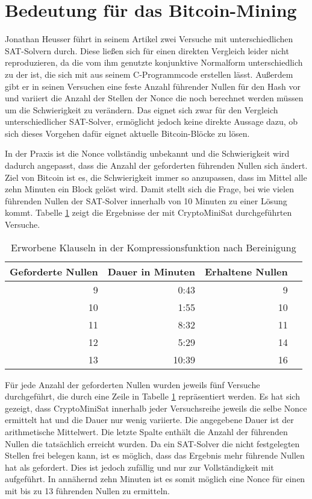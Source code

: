 \section{Bedeutung für das Bitcoin-Mining}

Jonathan Heusser führt in seinem Artikel \cite{jona:1} zwei Versuche mit unterschiedlichen SAT-Solvern durch.
Diese ließen sich für einen direkten Vergleich leider nicht reproduzieren, da die vom ihm genutzte konjunktive
Normalform unterschiedlich zu der ist, die sich mit  aus seinem C-Programmcode erstellen lässt.
Außerdem gibt er in seinen Versuchen eine feste Anzahl führender Nullen für den Hash vor und variiert die
Anzahl der Stellen der Nonce die noch berechnet werden müssen um die Schwierigkeit zu verändern. Das eignet
sich zwar für den Vergleich unterschiedlicher SAT-Solver, ermöglicht jedoch keine direkte Aussage dazu, ob
sich dieses Vorgehen dafür eignet aktuelle Bitcoin-Blöcke zu lösen.

In der Praxis ist die Nonce vollständig unbekannt und die Schwierigkeit wird dadurch angepasst, dass die Anzahl
der geforderten führenden Nullen sich ändert. Ziel von Bitcoin ist es, die Schwierigkeit immer so anzupassen, dass im Mittel
alle zehn Minuten ein Block gelöst wird. Damit stellt sich die Frage, bei wie vielen führenden Nullen der SAT-Solver
innerhalb von 10 Minuten zu einer Lösung kommt. Tabelle \ref{fig:bitcoinzeros} zeigt die Ergebnisse der mit CryptoMiniSat
durchgeführten Versuche.

\begin{table}[!h]
  \centering
  \begin{tabular}{rr|rr}
    Geforderte Nullen & Dauer in Minuten & Erhaltene Nullen \\
    \hline
     9 &  0:43 &  9 \\
    10 &  1:55 & 10 \\
    11 &  8:32 & 11 \\
    12 &  5:29 & 14 \\
    13 & 10:39 & 16
  \end{tabular}
  \caption{Erworbene Klauseln in der Kompressionsfunktion nach Bereinigung}
  \label{fig:bitcoinzeros}
\end{table}

Für jede Anzahl der geforderten Nullen wurden jeweils fünf Versuche durchgeführt, die durch eine Zeile in Tabelle \ref{fig:bitcoinzeros}
repräsentiert werden. Es hat sich gezeigt, dass CryptoMiniSat innerhalb jeder Versuchsreihe jeweils die selbe Nonce ermittelt hat
und die Dauer nur wenig variierte. Die angegebene Dauer ist der arithmetische Mittelwert. Die letzte Spalte enthält die Anzahl der
führenden Nullen die tatsächlich erreicht wurden. Da ein SAT-Solver die nicht festgelegten Stellen frei belegen kann, ist es möglich,
dass das Ergebnis mehr führende Nullen hat als gefordert. Dies ist jedoch zufällig und nur zur Vollständigkeit mit aufgeführt.
In annähernd zehn Minuten ist es somit möglich eine Nonce für einen  mit bis zu 13 führenden Nullen zu ermitteln.

